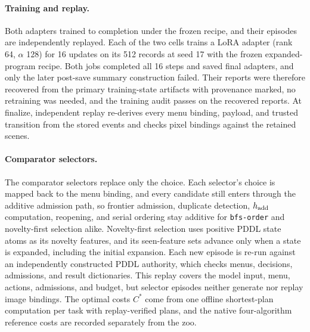 \paragraph{Training and replay.}
Both adapters trained to completion under the frozen recipe, and their episodes are independently replayed. Each of the two cells trains a LoRA adapter (rank 64, $\alpha$ 128) for 16 updates on its 512 records at seed 17 with the frozen expanded-program recipe. Both jobs completed all 16 steps and saved final adapters, and only the later post-save summary construction failed. Their reports were therefore recovered from the primary training-state artifacts with provenance marked, no retraining was needed, and the training audit passes on the recovered reports. At finalize, independent replay re-derives every menu binding, payload, and trusted transition from the stored events and checks pixel bindings against the retained scenes.

\paragraph{Comparator selectors.}
The comparator selectors replace only the choice. Each selector's choice is mapped back to the menu binding, and every candidate still enters through the additive admission path, so frontier admission, duplicate detection, $h_{\rm add}$ computation, reopening, and serial ordering stay additive for \texttt{bfs-order} and novelty-first selection alike. Novelty-first selection uses positive PDDL state atoms as its novelty features, and its seen-feature sets advance only when a state is expanded, including the initial expansion. Each new episode is re-run against an independently constructed PDDL authority, which checks menus, decisions, admissions, and result dictionaries. This replay covers the model input, menu, actions, admissions, and budget, but selector episodes neither generate nor replay image bindings. The optimal costs $C^*$ come from one offline shortest-plan computation per task with replay-verified plans, and the native four-algorithm reference costs are recorded separately from the zoo.

